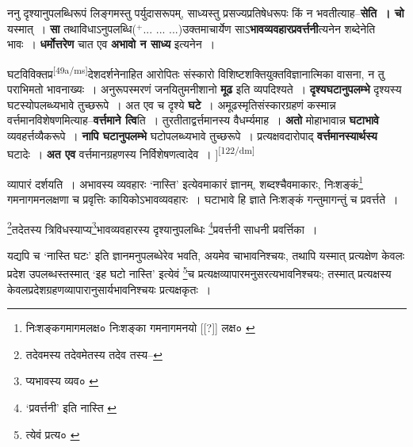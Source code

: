 \documentclass[article,12pt,a4paper]{memoir}
\newcommand{\add}[1]{($^{+}$#1)}
\begin{document}
	  \pstart ननु दृश्यानुपलब्धिरूपं लिङ्गमस्तु पर्युदासरूपम्, साध्यस्तु प्रसज्यप्रतिषेधरूपः किं न भवतीत्याह--\textbf{सेति । चो} यस्मात् । \textbf{सा} तथाविधाऽनुपलब्धि\add{... ... ...}उक्तमाचार्येण साऽ\textbf{भावव्यवहारप्रवर्त्तनी}त्यनेन शब्देनेति भावः । \textbf{धर्मोत्तरेण} चात एव \textbf{अभावो न साध्य} इत्यनेन ।
	\pend
      

	  \pstart घटविविक्तप्र\leavevmode\textsuperscript{\rmlatinfont\tiny [49a/ms]}देशदर्शनेनाहित आरोपितः संस्कारो विशिष्टशक्तियुक्तविज्ञानात्मिका वासना, न तु पराभिमतो भावनाख्यः । अनुरूपस्मरणं जनयितुमनीशानो \textbf{मूढ} इति व्यपदिश्यते । \textbf{दृश्यघटानुपलम्भे} दृश्यस्य घटस्योपलब्ध्यभावे तुच्छरूपे । अत एव च दृश्ये \textbf{घटे} । अमूढस्मृतिसंस्कारग्रहणं कस्मान्न वर्त्तमानविशेषणमित्याह--\textbf{वर्त्तमाने त्वि}ति । तुरतीताद्वर्त्तमानस्य वैधर्म्यमाह । \textbf{अतो} मोहाभावान्न \textbf{घटाभावे} व्यवहर्त्तव्यैकरूपे । \textbf{नापि घटानुपलम्भे} घटोपलब्ध्यभावे तुच्छरूपे । प्रत्यक्षवदारोपाद् \textbf{वर्त्तमानस्यार्थस्य} घटादेः । \textbf{अत एव} वर्त्तमानग्रहणस्य निर्विशेषणत्वादेव ।
	\pend
      [[अस्पष्टम्--सं०]]\leavevmode\textsuperscript{\rmlatinfont\tiny [122/dm]}

	  \pstart व्यापारं दर्शयति । अभावस्य व्यवहारः ‘नास्ति’ इत्येवमाकारं ज्ञानम्, शब्दश्चैवमाकारः, निःशङ्कं\footnote{निःशङ्कगमागमलक्ष० \cite{dp-msD} \cite{dp-msB} निःशङ्का गमनागमनयो [[?]] लक्ष० \cite{dp-msC}} गमनागमनलक्षणा च प्रवृत्तिः कायिकोऽभावव्यवहारः । घटाभावे हि ज्ञाते निःशङ्कं गन्तुमागन्तुं च प्रवर्त्तते ।
	\pend
       

	  \pstart \footnote{तदेवमस्य \cite{dp-msC} \cite{dp-msD} तदेवमेतस्य \cite{dp-msA} \cite{dp-edP} \cite{dp-edH} \cite{dp-edE} \cite{dp-edN} तदेव तस्य--\cite{dp-msB}}तदेतस्य त्रिविधस्याप्य\footnote{प्यभावस्य व्यव० \cite{dp-msC}}भावव्यवहारस्य दृश्यानुपलब्धिः \footnote{‘प्रवर्त्तनी’ इति नास्ति \cite{dp-msA} \cite{dp-msB} \cite{dp-msC} \cite{dp-msD} \cite{dp-edP} \cite{dp-edH} \cite{dp-edE} \cite{dp-edN}}प्रवर्त्तनी साधनी प्रवर्त्तिका ।
	\pend
       

	  \pstart यद्यपि च ‘नास्ति घटः’ इति ज्ञानमनुपलब्धेरेव भवति, अयमेव चाभावनिश्चयः, तथापि यस्मात् प्रत्यक्षेण केवलः प्रदेश उपलब्धस्तस्मात् ‘इह घटो नास्ति’ इत्येवं \footnote{त्येवं प्रत्य० \cite{dp-msC}}च प्रत्यक्षव्यापारमनुसरत्यभावनिश्चयः; तस्मात् प्रत्यक्षस्य केवलप्रदेशग्रहणव्यापारानुसार्यभावनिश्चयः प्रत्यक्षकृतः ।
	\pend
      
\end{document}

